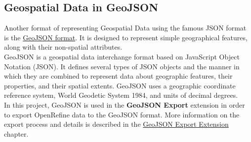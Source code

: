 \subsection{Geospatial Data in GeoJSON}
Another format of representing Geospatial Data using the famous JSON format is the \href{https://datatracker.ietf.org/doc/html/rfc7946}{GeoJSON format}.
It is designed to represent simple geographical features, along with their non-spatial attributes.\\
\newline
GeoJSON is a geospatial data interchange format based on JavaScript
Object Notation (JSON).  It defines several types of JSON objects and
the manner in which they are combined to represent data about
geographic features, their properties, and their spatial extents.
GeoJSON uses a geographic coordinate reference system, World Geodetic
System 1984, and units of decimal degrees. \cite{WhatIsGeoJSON}\\
\newline
In this project, GeoJSON is used in the \textbf{GeoJSON Export} extension in order to export OpenRefine data to the
GeoJSON format. More information on the export process and details is described in the \hyperref[ch:the-geojson-export-extension]{GeoJSON Export Extension} chapter.